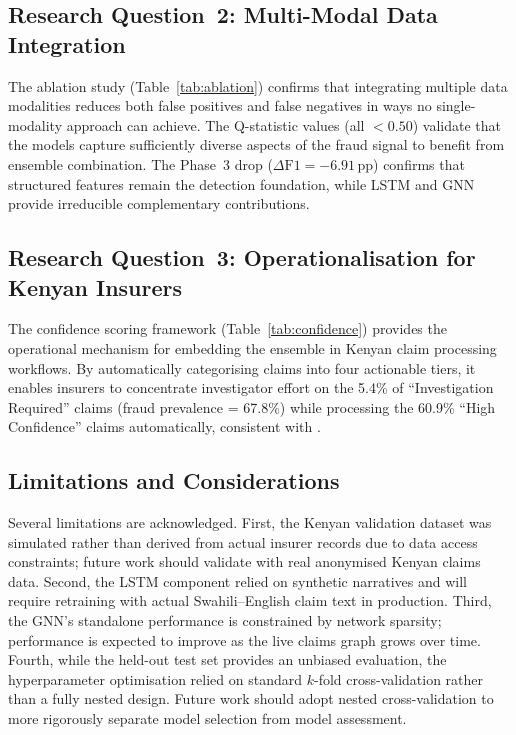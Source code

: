 \documentclass[12pt,a4paper,oneside]{report}
\numberwithin{equation}{chapter}
\begin{document}
\subsection{Research Question~2: Multi-Modal Data Integration}

The ablation study (Table~\ref{tab:ablation}) confirms that integrating multiple data modalities
reduces both false positives and false negatives in ways no single-modality approach can achieve.
The Q-statistic values (all $< 0.50$) validate that the models capture sufficiently diverse
aspects of the fraud signal to benefit from ensemble combination. The Phase~3 drop
($\Delta\text{F1} = -6.91$\,pp) confirms that structured features remain the detection
foundation, while LSTM and GNN provide irreducible complementary contributions.

\subsection{Research Question~3: Operationalisation for Kenyan Insurers}

The confidence scoring framework (Table~\ref{tab:confidence}) provides the operational mechanism
for embedding the ensemble in Kenyan claim processing workflows. By automatically categorising
claims into four actionable tiers, it enables insurers to concentrate investigator effort on the
5.4\% of ``Investigation Required'' claims (fraud prevalence = 67.8\%) while processing the
60.9\% ``High Confidence'' claims automatically, consistent with \cite{Scrivano2024}.

\subsection{Limitations and Considerations}
\label{sec:limitations}

Several limitations are acknowledged. First, the Kenyan validation dataset was simulated rather
than derived from actual insurer records due to data access constraints; future work should
validate with real anonymised Kenyan claims data. Second, the LSTM component relied on synthetic
narratives and will require retraining with actual Swahili--English claim text in production.
Third, the GNN's standalone performance is constrained by network sparsity; performance is
expected to improve as the live claims graph grows over time. Fourth, while the held-out test set
provides an unbiased evaluation, the hyperparameter optimisation relied on standard $k$-fold
cross-validation rather than a fully nested design. Future work should adopt nested cross-validation
to more rigorously separate model selection from model assessment.
\end{document}
